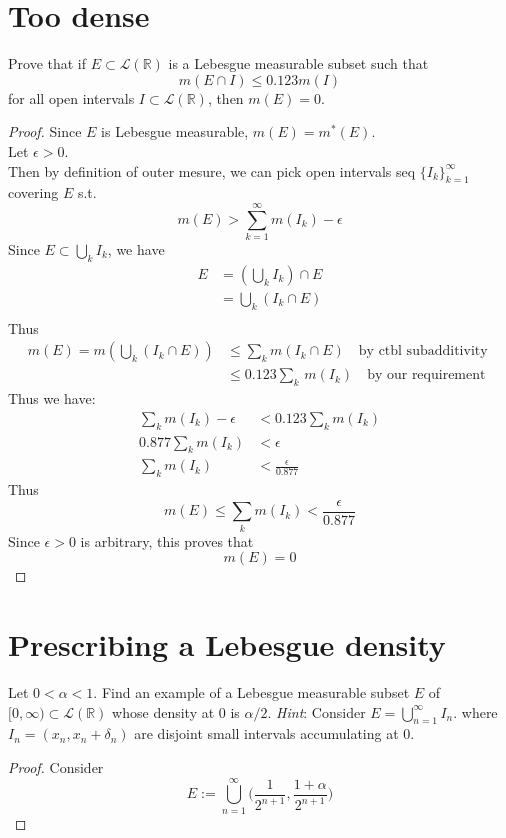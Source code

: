 \documentclass[lang=cn,11pt]{elegantbook}
\begin{document}
\section{Too dense}
  Prove that if $E\subset \mathcal{L}(\mathbb{R})$ is a Lebesgue measurable subset such that  \[
    m(E\cap I)\le 0.123m(I) 
  \]
  for all open intervals $I\subset  \mathcal{L}(\mathbb{R})$, then $m(E)=0$. 
\begin{proof}
    Since $E$ is Lebesgue measurable, $m(E) = m^*(E)$.\\
    Let $\epsilon > 0$.\\
    Then by definition of outer mesure, we can pick open intervals seq $\{I_k\}_{k=1}^\infty$ covering $E$ s.t. \[
   m(E) >  \sum_{k=1}^\infty m(I_k )    -\epsilon
    \] Since $E \subset \bigcup_k I_k$, we have  \begin{align}
        E & = (\bigcup_k I_k)  \cap E \\
        & = \bigcup_k (I_k \cap E)\\
    \end{align}
    Thus \begin{align}
        m(E) = m(\bigcup_k (I_k \cap E)) &\leq \sum_k m(I_k \cap E)\quad\text{by ctbl subadditivity }\\
        &\leq 0.123 \sum_k \,m(I_k)  \quad \text{by our requirement}
    \end{align}
    Thus we have: 
    \begin{align}
            \sum_k  m(I_k )    -\epsilon &<  0.123 \sum_k m(I_k)\\
            0.877 \sum_k m(I_k) &< \epsilon\\
            \sum_k m(I_k) &< \frac{\epsilon}{0.877}
    \end{align}
  Thus   \[
  m(E) \leq   \sum_k  m(I_k )   <  \frac{\epsilon}{0.877}
    \]
    Since $\epsilon > 0$ is arbitrary, this proves that \[
    m(E)  = 0
    \]
\end{proof}




\section{Prescribing a Lebesgue density}
  Let $0<\alpha <1$.
    Find an example of a Lebesgue measurable subset $E$ of $[0,\infty)\subset  \mathcal{L}(\mathbb{R})$ whose density at $0$ is $\alpha/2$. 
    \textit{Hint}: Consider $E=\bigcup_{n=1}^\infty I_n$. where $I_n=(x_n,x_n+\delta_n)$ are disjoint small intervals accumulating at $0$.
\begin{proof}
    Consider \[
E := \bigcup_{n=1}^{\infty}
\bigr( \frac{1}{2^{n+1}},
 \frac{1+\alpha}{2^{n+1}}\bigr)
\]

\end{proof}
\end{document}
